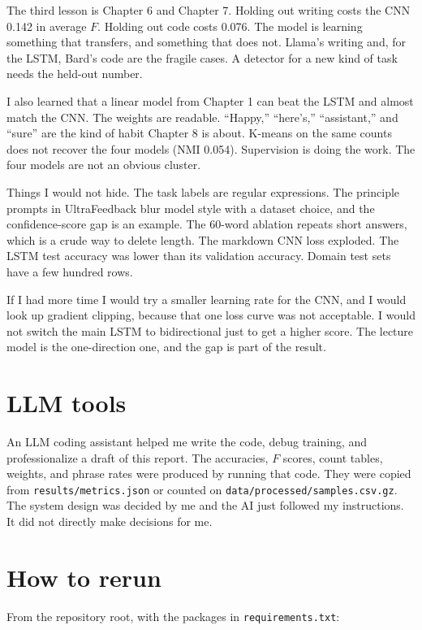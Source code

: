\documentclass[11pt]{article}
\begin{document}
The third lesson is Chapter 6 and Chapter 7. Holding out writing costs the CNN 0.142 in average $F$. Holding out code costs 0.076. The model is learning something that transfers, and something that does not. Llama's writing and, for the LSTM, Bard's code are the fragile cases. A detector for a new kind of task needs the held-out number.

I also learned that a linear model from Chapter 1 can beat the LSTM and almost match the CNN. The weights are readable. ``Happy,'' ``here's,'' ``assistant,'' and ``sure'' are the kind of habit Chapter 8 is about. K-means on the same counts does not recover the four models (NMI 0.054). Supervision is doing the work. The four models are not an obvious cluster.

Things I would not hide. The task labels are regular expressions. The principle prompts in UltraFeedback blur model style with a dataset choice, and the confidence-score gap is an example. The 60-word ablation repeats short answers, which is a crude way to delete length. The markdown CNN loss exploded. The LSTM test accuracy was lower than its validation accuracy. Domain test sets have a few hundred rows.

If I had more time I would try a smaller learning rate for the CNN, and I would look up gradient clipping, because that one loss curve was not acceptable. I would not switch the main LSTM to bidirectional just to get a higher score. The lecture model is the one-direction one, and the gap is part of the result.

\section{LLM tools}
\label{sec:llmuse}

An LLM coding assistant helped me write the code, debug training, and professionalize a draft of this report. The accuracies, $F$ scores, count tables, weights, and phrase rates were produced by running that code. They were copied from \texttt{results/\allowbreak metrics.json} or counted on \texttt{data/\allowbreak processed/\allowbreak samples.csv.gz}. The system design was decided by me and the AI just followed my instructions. It did not directly make decisions for me.

\section{How to rerun}
\label{sec:repro}

From the repository root, with the packages in \texttt{requirements.txt}:
\end{document}
